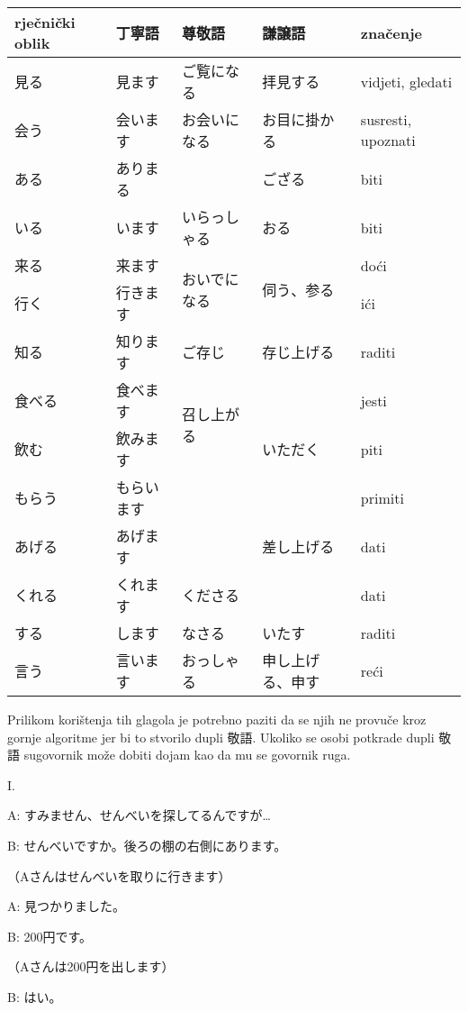 	\begin{table}[h]
		\centering
		\begin{tabular}{l l l l l}\toprule[2pt]
			rječnički oblik & 丁寧語 & 尊敬語 & 謙譲語　& značenje\\
			\midrule
			見る & 見ます & ご覧になる & 拝見する & vidjeti, gledati\\
			会う & 会います & お会いになる & お目に掛かる & susresti, upoznati \\
			ある & ありまる & & ござる & biti\\
			いる & います & いらっしゃる & おる & biti\\
			来る & 来ます & \multirow{2}{100pt}{おいでになる} & \multirow{2}{100pt}{伺う、参る} & doći\\
			行く & 行きます &  & & ići\\
			知る & 知ります & ご存じ & 存じ上げる & raditi\\
			食べる　& 食べます & \multirow{2}{100pt}{召し上がる} & \multirow{3}{100pt}{いただく} & jesti\\
			飲む　& 飲みます & & & piti\\
			もらう & もらいます & & & primiti\\
			あげる　& あげます & & 差し上げる & dati\\
			くれる　& くれます & くださる & & dati\\
			する　& します & なさる & いたす & raditi\\
			言う & 言います & おっしゃる　& 申し上げる、申す & reći\\
			\bottomrule[2pt]
		\end{tabular}
	\end{table}
	
	Prilikom korištenja tih glagola je potrebno paziti da se njih ne provuče kroz gornje algoritme jer bi to stvorilo dupli 敬語. Ukoliko se osobi potkrade dupli 敬語 sugovornik može dobiti dojam kao da mu se govornik ruga.
	
	
	I.
	
	A: すみません、せんべいを探してるんですが…
	
	B: せんべいですか。後ろの棚の右側にあります。
	
	（Aさんはせんべいを取りに行きます）
	
	A: 見つかりました。	
	
	B: 200円です。
	
	（Aさんは200円を出します）
	
	B: はい。

